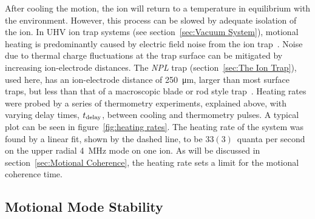     After cooling the motion, the ion will return to a temperature in equilibrium with the environment. However, this process can be slowed by adequate isolation of the ion. In UHV ion trap systems (see section~\ref{sec:Vacuum System}), motional heating is predominantly caused by electric field noise from the ion trap~\cite{wineland1998experimental}. Noise due to thermal charge fluctuations at the trap surface can be 
    mitigated by increasing ion-electrode distances. The \emph{NPL} trap (section~\ref{sec:The Ion Trap}), used here, has an ion-electrode 
    distance of 250~\unit{\um}, larger than most surface traps, but less than that of a
    macroscopic blade or rod style trap~\cite{milne2021construction}. Heating rates were probed by a series of thermometry experiments, explained above, with varying delay
    times, $t_{\rm delay}$, between cooling and thermometry pulses. A typical plot can be seen in
    figure~\ref{fig:heating rates}. The heating rate of the system
    was found by a linear fit, shown by the dashed line, to be $33(3)$~quanta per second on the upper radial 4~\unit{\MHz} mode on
    one ion. As will be discussed in section~\ref{sec:Motional Coherence}, the heating rate sets a limit for the motional coherence time.\\


\subsection{Motional Mode Stability}
\label{sec:Motional Mode Stability}

